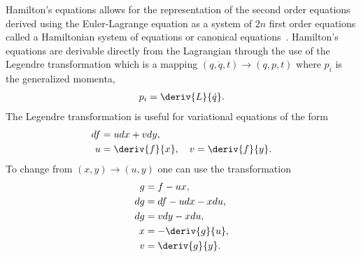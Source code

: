 Hamilton's equations allows for the representation of the second order equations derived using the Euler-Lagrange equation as a system of \( 2n \) first order equations called a Hamiltonian system of equations or canonical equations~\cite{arnold1989}.
Hamilton's equations are derivable directly from the Lagrangian through the use of the Legendre transformation which is a mapping \( \left( q, \dot{q},t\right) \rightarrow \left(q, p, t \right) \) where \( p_i\) is the generalized momenta,
\begin{align}\label{eq:legendre_transform}
	p_i = \deriv{L}{\dot{q}}.
\end{align}
The Legendre transformation is useful for variational equations of the form
\begin{align*}
	df &= u dx + v dy, \\
	u &= \deriv{f}{x},\quad v = \deriv{f}{y}.
\end{align*}
To change from \( \left( x, y\right) \rightarrow \left(u,y \right) \) one can use the transformation
\begin{align*}
	g &= f - u x,\\
	dg &= df - u dx - x du, \\
	dg &= v dy - x du, \\
	x&= -\deriv{g}{u}, \\
    v&= \deriv{g}{y}.
\end{align*}

